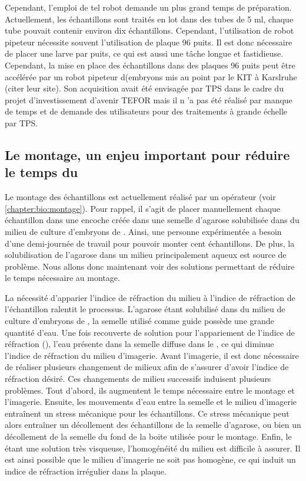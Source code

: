 \documentclass[\main/main.tex]{subfiles}
\begin{document}
%
Cependant, l'emploi de tel robot demande un plus grand temps de préparation.
%
Actuellement, les échantillons sont traités en lot dans des tubes de 5 ml,
chaque tube pouvait contenir environ dix échantillons.
%
Cependant, l'utilisation de robot pipeteur nécessite souvent l'utilisation de plaque 96 puits.
%
Il est donc nécessaire de placer une larve par puits,
ce qui est aussi une tâche longue et fastidieuse.
%
Cependant, la mise en place des échantillons dans des plaques 96 puits peut être accélérée par un robot pipeteur d(embryons mis au point par le KIT à Karslruhe (citer leur site). Son acquisition avait été envisagée par TPS dans le cadre du projet d'investissement d'avenir TEFOR mais il n 'a pas été réalisé par manque de temps et de demande des utilisateurs pour des traitements à grande échelle par TPS.

    \subsection{Le montage, un enjeu important pour réduire le temps du \hcs{}}

%    
Le montage des échantillons est actuellement réalisé par un opérateur (voir \autoref{chapter:bio:montage}).
%
Pour rappel, il s'agit de placer manuellement chaque échantillon dans une encoche créée dans une semelle d'agarose solubilisée dans du milieu de culture d'embryons de \pzs{}.
%
Ainsi, une personne expérimentée a besoin d'une demi-journée de travail pour pouvoir monter cent échantillons.
%
De plus, la solubilisation de l'agarose dans un milieu principalement aqueux est source de problème.
%
Nous allons donc maintenant voir des solutions permettant de réduire le temps nécessaire au montage.

La nécessité d'apparier l'indice de réfraction du milieu à l'indice de réfraction de l'échantillon ralentit le processus.
%
L'agarose étant solubilisé dans du milieu de culture d'embryons de \pz{},
la semelle utilisé comme guide possède une grande quantité d'eau.
%
Une fois recouverte de solution pour l'appariement de l'indice de réfraction (\MD{}),
l'eau présente dans la semelle diffuse dans le \MD{}, ce qui diminue l'indice de réfraction du milieu d'imagerie.
%
Avant l'imagerie,
il est donc nécessaire de réaliser plusieurs changement de milieux afin de s'assurer d'avoir l'indice de réfraction désiré.
%
Ces changements de milieu successifs induisent plusieurs problèmes. Tout d'abord, ils augmentent le temps nécessaire entre le montage et l'imagerie.
%
Ensuite, les mouvements d'eau entre la semelle et le milieu d'imagerie entraînent un stress mécanique pour les échantillons.
%
Ce stress mécanique peut alors entraîner un décollement des échantillons de la semelle d'agarose,
ou bien un décollement de la semelle du fond de la boite utilisée pour le montage.
%
Enfin, le \MD{} étant une solution très visqueuse,  l'homogénéité du milieu est difficile à assurer.
%
Il est ainsi possible que le milieu d'imagerie ne soit pas homogène, ce qui induit un indice de réfraction irrégulier dans la plaque.
\end{document}

